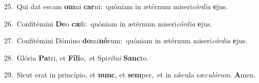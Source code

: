 {\numbfont\textcolor{\numbcolor}{25.}}~Qui dat escam \textbf{om}\-ni \textbf{car}\-ni:~\star quóniam in ætérnum miseri\-\textit{cór}\-\textit{di}\textit{a} \textbf{e}\-jus.\par
{\numbfont\textcolor{\numbcolor}{26.}}~Confitémini \textbf{De}\-o \textbf{cæ}\-li:~\star quóniam in ætérnum miseri\-\textit{cór}\-\textit{di}\textit{a} \textbf{e}\-jus.\par
{\numbfont\textcolor{\numbcolor}{27.}}~Confitémini Dómino \textbf{do}\-mi\-\textbf{nó}\-rum:~\star quóniam in ætérnum miseri\-\textit{cór}\-\textit{di}\textit{a} \textbf{e}\-jus.\par
{\numbfont\textcolor{\numbcolor}{28.}}~Glória \textbf{Pa}\-tri, et \textbf{Fí}\-\textbf{li}o,~\star et Spi\-\textit{rí}\-\textit{tu}\textit{i} \textbf{Sanc}\-to.\par
{\numbfont\textcolor{\numbcolor}{29.}}~Sicut erat in princípio, et \textbf{nunc}\-, et \textbf{sem}\-per,~\star et in sǽcula sæ\-\textit{cu}\-\textit{ló}\textit{rum}. \textbf{A}\-men.\par
